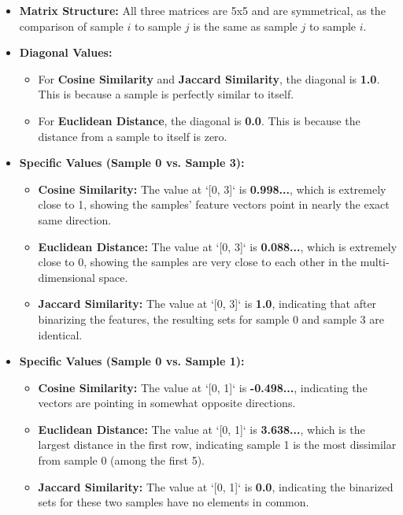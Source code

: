 \documentclass[12pt,a4paper]{article}
\begin{document}
\begin{itemize}
    \item \textbf{Matrix Structure:} All three matrices are 5x5 and are symmetrical, as the comparison of sample $i$ to sample $j$ is the same as sample $j$ to sample $i$.
    \item \textbf{Diagonal Values:}
        \begin{itemize}
            \item For \textbf{Cosine Similarity} and \textbf{Jaccard Similarity}, the diagonal is \textbf{1.0}. This is because a sample is perfectly similar to itself.
            \item For \textbf{Euclidean Distance}, the diagonal is \textbf{0.0}. This is because the distance from a sample to itself is zero.
        \end{itemize}
    \item \textbf{Specific Values (Sample 0 vs. Sample 3):}
        \begin{itemize}
            \item \textbf{Cosine Similarity:} The value at `[0, 3]` is \textbf{0.998...}, which is extremely close to 1, showing the samples' feature vectors point in nearly the exact same direction.
            \item \textbf{Euclidean Distance:} The value at `[0, 3]` is \textbf{0.088...}, which is extremely close to 0, showing the samples are very close to each other in the multi-dimensional space.
            \item \textbf{Jaccard Similarity:} The value at `[0, 3]` is \textbf{1.0}, indicating that after binarizing the features, the resulting sets for sample 0 and sample 3 are identical.
        \end{itemize}
    \item \textbf{Specific Values (Sample 0 vs. Sample 1):}
        \begin{itemize}
            \item \textbf{Cosine Similarity:} The value at `[0, 1]` is \textbf{-0.498...}, indicating the vectors are pointing in somewhat opposite directions.
            \item \textbf{Euclidean Distance:} The value at `[0, 1]` is \textbf{3.638...}, which is the largest distance in the first row, indicating sample 1 is the most dissimilar from sample 0 (among the first 5).
            \item \textbf{Jaccard Similarity:} The value at `[0, 1]` is \textbf{0.0}, indicating the binarized sets for these two samples have no elements in common.
        \end{itemize}
\end{itemize}
\end{document}

